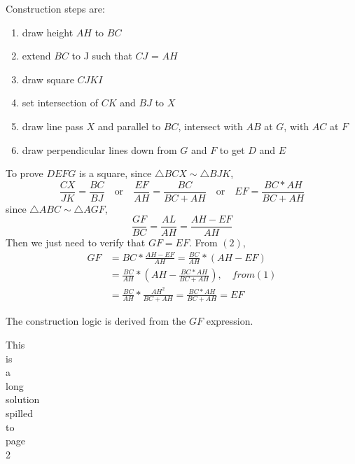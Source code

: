 \documentclass[12pt]{article}
\begin{document}
	\noindent
	Construction steps are:
	\begin{enumerate}[topsep=0pt,itemsep=-1ex,partopsep=1ex,parsep=1ex]
		\item draw height $AH$ to $BC$
		\item extend $BC$ to J such that $CJ$ = $AH$
		\item draw square $CJKI$
		\item set intersection of $CK$ and $BJ$ to $X$
		\item draw line pass $X$ and parallel to $BC$, intersect with $AB$ at $G$, with $AC$ at $F$
		\item draw perpendicular lines down from $G$ and $F$ to get $D$ and $E$		
	\end{enumerate}

	\noindent
	To prove $DEFG$ is a square, since $\triangle BCX \sim \triangle BJK$,
	\begin{equation}
		\frac{CX}{JK} = \frac{BC}{BJ} 
		\quad \textrm{or} \quad \frac{EF}{AH} = \frac{BC}{BC + AH}
		\quad \textrm{or} \quad EF = \frac{BC * AH}{BC + AH}
	\end{equation}
	since $\triangle ABC \sim \triangle AGF$,
	\begin{equation}
		\frac{GF}{BC} = \frac{AL}{AH} = \frac{AH - EF}{AH}		
	\end{equation}
	Then we just need to verify that $GF = EF$. From $(2)$,
	\begin{equation}
		\begin{aligned}
		GF &= BC * \frac{AH - EF}{AH} = \frac{BC}{AH} *(AH - EF)\\ 
		   &= \frac{BC}{AH} * (AH - \frac{BC * AH}{BC + AH}), \quad from (1)\\
		   &= \frac{BC}{AH} * \frac{AH^2}{BC + AH} = \frac{BC * AH}{BC + AH} = EF
		\end{aligned}
	\end{equation}

	\noindent
	The construction logic is derived from the $GF$ expression.
	
	This\\
	is \\
	a \\
	long \\
	solution\\
	spilled\\
	to\\
	page\\
	2
\end{document}
